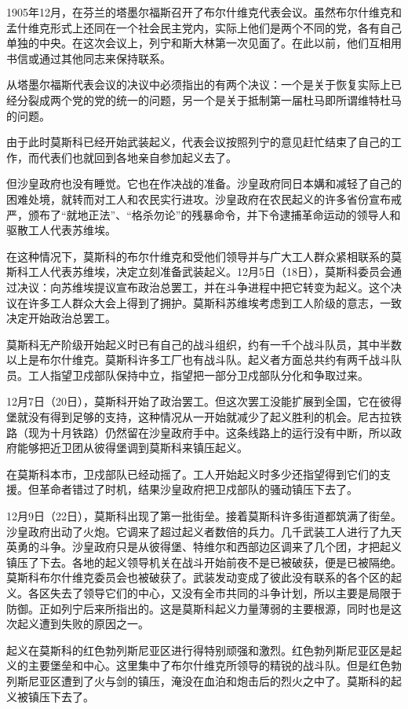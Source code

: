 1905年12月，在芬兰的塔墨尔福斯召开了布尔什维克代表会议。虽然布尔什维克和孟什维克形式上还同在一个社会民主党内，实际上他们是两个不同的党，各有自己单独的中央。在这次会议上，列宁和斯大林第一次见面了。在此以前，他们互相用书信或通过其他同志来保持联系。

从塔墨尔福斯代表会议的决议中必须指出的有两个决议：一个是关于恢复实际上已经分裂成两个党的党的统一的问题，另一个是关于抵制第一届杜马即所谓维特杜马的问题。

由于此时莫斯科已经开始武装起义，代表会议按照列宁的意见赶忙结束了自己的工作，而代表们也就回到各地亲自参加起义去了。

但沙皇政府也没有睡觉。它也在作决战的准备。沙皇政府同日本媾和减轻了自己的困难处境，就转而对工人和农民实行进攻。沙皇政府在农民起义的许多省份宣布戒严，颁布了“就地正法”、“格杀勿论”的残暴命令，并下令逮捕革命运动的领导人和驱散工人代表苏维埃。

在这种情况下，莫斯科的布尔什维克和受他们领导并与广大工人群众紧相联系的莫斯科工人代表苏维埃，决定立刻准备武装起义。12月5日（18日），莫斯科委员会通过决议：向苏维埃提议宣布政治总罢工，并在斗争进程中把它转变为起义。这个决议在许多工人群众大会上得到了拥护。莫斯科苏维埃考虑到工人阶级的意志，一致决定开始政治总罢工。

莫斯科无产阶级开始起义时已有自己的战斗组织，约有一千个战斗队员，其中半数以上是布尔什维克。莫斯科许多工厂也有战斗队。起义者方面总共约有两千战斗队员。工人指望卫戍部队保持中立，指望把一部分卫戍部队分化和争取过来。

12月7日（20日），莫斯科开始了政治罢工。但这次罢工没能扩展到全国，它在彼得堡就没有得到足够的支持，这种情况从一开始就减少了起义胜利的机会。尼古拉铁路（现为十月铁路）仍然留在沙皇政府手中。这条线路上的运行没有中断，所以政府能够把近卫团从彼得堡调到莫斯科来镇压起义。

在莫斯科本市，卫戍部队已经动摇了。工人开始起义时多少还指望得到它们的支援。但革命者错过了时机，结果沙皇政府把卫戍部队的骚动镇压下去了。

12月9日（22日），莫斯科出现了第一批街垒。接着莫斯科许多街道都筑满了街垒。沙皇政府出动了火炮。它调来了超过起义者数倍的兵力。几千武装工人进行了九天英勇的斗争。沙皇政府只是从彼得堡、特维尔和西部边区调来了几个团，才把起义镇压了下去。各地的起义领导机关在战斗开始前夜不是已被破获，便是已被隔绝。莫斯科布尔什维克委员会也被破获了。武装发动变成了彼此没有联系的各个区的起义。各区失去了领导它们的中心，又没有全市共同的斗争计划，所以主要是局限于防御。正如列宁后来所指出的。这是莫斯科起义力量薄弱的主要根源，同时也是这次起义遭到失败的原因之一。

起义在莫斯科的红色勃列斯尼亚区进行得特别顽强和激烈。红色勃列斯尼亚区是起义的主要堡垒和中心。这里集中了布尔什维克所领导的精锐的战斗队。但是红色勃列斯尼亚区遭到了火与剑的镇压，淹没在血泊和炮击后的烈火之中了。莫斯科的起义被镇压下去了。

